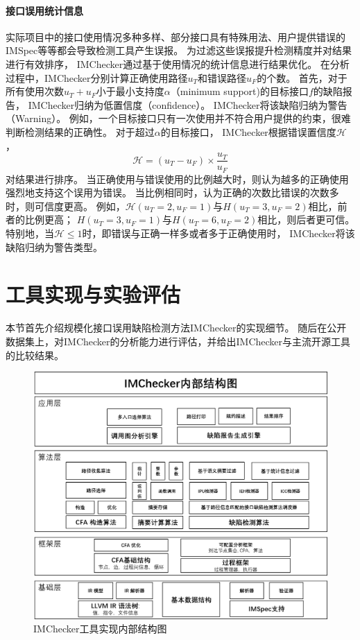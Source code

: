 \paragraph{接口误用统计信息}
实际项目中的接口使用情况多种多样、部分接口具有特殊用法、用户提供错误的IMSpec等等都会导致检测工具产生误报。
为过滤这些误报提升检测精度并对结果进行有效排序，
IMChecker通过基于使用情况的统计信息进行结果优化。
在分析过程中，IMChecker分别计算正确使用路径$u_T$和错误路径$u_F$的个数。
首先，对于所有使用次数$u_T+u_F$小于最小支持度$\alpha$（minimum support)的目标接口$f$的缺陷报告，
IMChecker归纳为低置信度（confidence）。
IMChecker将该缺陷归纳为警告（Warning）。
例如，一个目标接口只有一次使用并不符合用户提供的约束，很难判断检测结果的正确性。
对于超过$\alpha$的目标接口，
IMChecker根据错误置信度$\mathcal{H}$，
\begin{equation}
\label{eq:3-1}
\mathcal{H}  = ({u_T-u_F})\times\dfrac{u_T}{u_F}
\end{equation}
对结果进行排序。
当正确使用与错误使用的比例越大时，则认为越多的正确使用强烈地支持这个误用为错误。
当比例相同时，认为正确的次数比错误的次数多时，则可信度更高。
例如，$\mathcal{H}(u_T=2, u_F=1)$与$H(u_T=3, u_F=2)$相比，前者的比例更高；
$H(u_T=3, u_F=1)$与$H(u_T=6, u_F=2)$相比，则后者更可信。
特别地，当$\mathcal{H} \le 1$时，即错误与正确一样多或者多于正确使用时，
IMChecker将该缺陷归纳为警告类型。

\section{工具实现与实验评估}
\label{sec:3.4}
本节首先介绍规模化接口误用缺陷检测方法IMChecker的实现细节。
随后在公开数据集上，对IMChecker的分析能力进行评估，并给出IMChecker与主流开源工具的比较结果。

\begin{figure}[t]
	\centering
	\includegraphics[width=0.9\linewidth]{figures/cp3-implementation.png}
	\caption{
		IMChecker工具实现内部结构图
	}
	\label{fig:3-4-implementation}
\end{figure}

